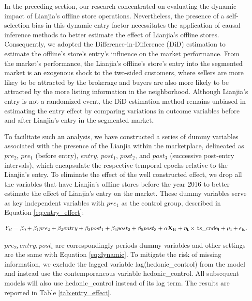 \documentclass[11pt]{article}
\begin{document}
In the preceding section, our research concentrated on evaluating the dynamic impact of Lianjia's offline store operations. Nevertheless, the presence of a self-selection bias in this dynamic entry factor necessitates the application of causal inference methods to better estimate the effect of Lianjia's offline stores. Consequently, we adopted the Difference-in-Difference (DiD) estimation to estimate the offline's store's entry's influence on the market performance. From the market's performance, the Lianjia's offline's store's entry into the segmented market is an exogenous shock to the two-sided customers, where sellers are more likey to be attracted by the brokerage and buyers are also more likely to be attracted by the more listing information in the neighborhood. Although Lianjia's entry is not a randomized event, the DiD estimation method remains unbiased in estimating the entry effect by comparing variations in outcome variables before and after Lianjia's entry in the segmented market.

To facilitate such an analysis, we have constructed a series of dummy variables associated with the presence of the Lianjia within the marketplace, delineated as $pre_2$, $pre_1$ (before entry), $entry$, $post_1$, $post_2$, and $post_3$ (successive post-entry intervals), which encapsulate the respective temporal epochs relative to the Lianjia's entry. To eliminate the effect of the well constructed effect, we drop all the variables that have Lianjia's offline stores before the year 2016 to better estimate the effect of Lianjia's entry on the market. These dummy variables serve as key independent variables with $pre_1$ as the control group, described in Equation \eqref{eq:entry_effect}:

\begin{equation}
  Y_{it} = \beta_0 +  \beta_1 pre_2 + \beta_2 entry + \beta_3 post_1 + \beta_4 post_2 + \beta_5 post_3 + \bf{\alpha} \bf{X}_{it} + \eta_{t} \times \text{bs\_code}_i + \mu_i + \epsilon_{it}.   \label{eq:entry_effect}
\end{equation}

$pre_2, entry, post_i$ are correspondingly periods dummy variables and other settings are the same with Equation \eqref{eq:dynamic}. To mitigate the risk of missing information, we exclude the lagged variable lag(hedonic\_control) from the model and instead use the contemporaneous variable hedonic\_control. All subsequent models will also use hedonic\_control instead of its lag term. The results are reported in Table \ref{tab:entry_effect}.
\end{document}
